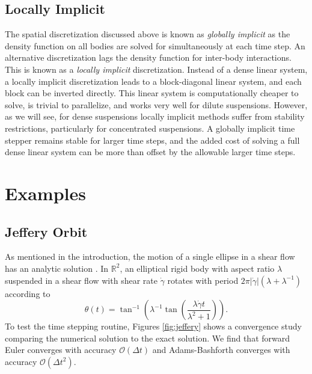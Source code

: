 \subsection{Locally Implicit}

The spatial discretization discussed above is known as \emph{globally implicit} as the density function on all bodies are solved for simultaneously at each time step. An alternative discretization \cite{Rahimian2010, Lu2017} lags the density function for inter-body interactions. This is known as a \emph{locally implicit} discretization. Instead of a dense linear system, a locally implicit discretization leads to a block-diagonal linear system, and each block can be inverted directly. This linear system is computationally cheaper to solve, is trivial to parallelize, and works very well for dilute suspensions. However, as we will see, for dense suspensions locally implicit methods suffer from stability restrictions, particularly for concentrated suspensions. A globally implicit time stepper remains stable for larger time steps, and the added cost of solving a full dense linear system can be more than offset by the allowable larger time steps. 


\section{Examples}

\subsection{Jeffery Orbit}

As mentioned in the introduction, the motion of a single ellipse in a shear flow has an analytic solution \cite{Jeffery1922}. In $\mathbb{R}^2$, an elliptical rigid body with aspect ratio $\lambda$ suspended in a shear flow with shear rate $\dot{\gamma}$ rotates with period $2\pi|\dot{\gamma}|(\lambda + \lambda^{-1})$ according to
\[ \theta(t) = \tan^{-1}\left( \lambda^{-1}\tan\left(\frac{\lambda \dot{\gamma} t}{\lambda^2 + 1}\right)\right).\]
To test the time stepping routine, Figures \ref{fig:jeffery} shows a convergence study comparing the numerical solution to the exact solution. We find that forward Euler converges with accuracy $\mathcal{O}(\Delta t)$ and Adams-Bashforth converges with accuracy $\mathcal{O}(\Delta t^2)$. 


